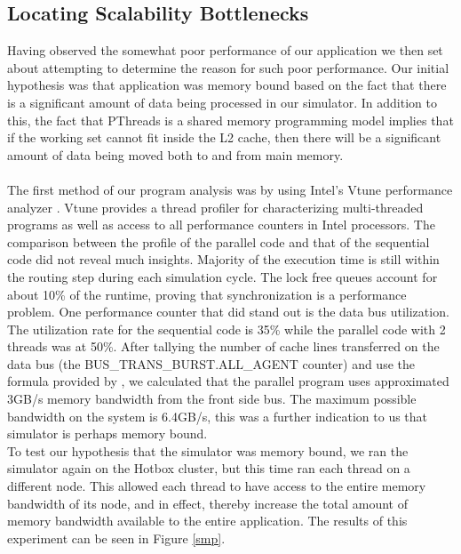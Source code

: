\documentclass[twocolumn]{article}
\begin{document}
\subsection{Locating Scalability Bottlenecks}
Having observed the somewhat poor performance of our application we then
set about attempting to determine the reason for such poor performance.
Our initial hypothesis was that application was memory bound based on the
fact that there is a significant amount of data being processed in our
simulator.  In addition to this, the fact that PThreads is a shared memory
programming model implies that if the working set cannot fit inside the L2
cache, then there will be a significant amount of data being moved both to
and from main memory.\\
~\\
The first method of our program analysis was by using Intel's Vtune performance analyzer \cite{vtune}. Vtune provides a thread profiler for characterizing multi-threaded programs as well as access to all performance counters in Intel processors. The comparison between the profile of the parallel code and that of the sequential code did not reveal much insights. Majority of the execution time is still within the routing step during each simulation cycle. The lock free queues account for about 10\% of the runtime, proving that synchronization is a performance problem. One performance counter that did stand out is the data bus utilization. The utilization rate for the sequential code is 35\% while the parallel code with 2 threads was at 50\%. After tallying the number of cache lines transferred on the data bus (the BUS\_TRANS\_BURST.ALL\_AGENT counter) and use the formula provided by \cite{account}, we calculated that the parallel program uses approximated 3GB/s memory bandwidth from the front side bus. The maximum possible bandwidth on the system is 6.4GB/s, this was a further indication to us that simulator is perhaps memory bound. 
~\\
To test our hypothesis that the simulator was memory bound, we ran the
simulator again on the Hotbox cluster, but this time ran each thread on a
different node.  This allowed each thread to have access to the entire
memory bandwidth of its node, and in effect, thereby increase the total
amount of memory bandwidth available to the entire application.  The
results of this experiment can be seen in Figure \ref{smp}.\\
\end{document}
